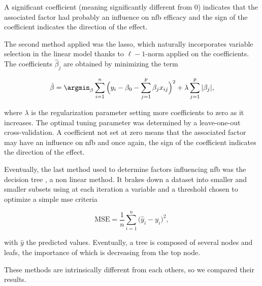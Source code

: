 A significant coefficient (meaning significantly different from 0) indicates that the associated factor had probably an influence on \gls{nfb} efficacy and the sign 
of the coefficient indicates the direction of the effect.

The second method applied was the \gls{lasso}, which naturally incorporates variable selection 
in the linear model thanks to $\ell-1$-norm applied on the coefficients. The coefficients $\hat{\beta}_j$ are obtained by minimizing the term

\begin{equation}
\label{eq:factors_lasso-minimization}
\hat{\beta} = \argmin_\beta \sum_{i=1}^{n} \Big(y_i - \beta_{0} - \sum_{j=1}^{p}\beta_{j}x_{ij}\Big)^2 + \lambda \sum_{j=1}^{p}|\beta_{j}|,
\end{equation} 

where $\lambda$ is the regularization parameter setting more coefficients to zero as it increases. The optimal tuning parameter was determined 
by a leave-one-out cross-validation. A coefficient not set at zero means that the associated factor may have an influence on \gls{nfb} and once again,
the sign of the coefficient indicates the direction of the effect.

Eventually, the last method used to determine factors influencing \gls{nfb} was the decision tree \citep{Quinlan1986}, a non linear method. It brakes down a dataset into smaller
and smaller subsets using at each iteration a variable and a threshold chosen to optimize a simple \gls{mse} criteria 

\begin{equation}
\label{eq:factors_decision_tree_mse}
\text{MSE} = \frac{1}{n}\sum_{i=1}^{n} \Big(\hat{y}_i - {y}_i\Big)^2,
\end{equation}

with $\hat{y}$ the predicted values.
Eventually, a tree is composed of several nodes and leafs, the importance of which is decreasing from the top node. 

These methods are intrinsically different from each others, so we compared their results.
















